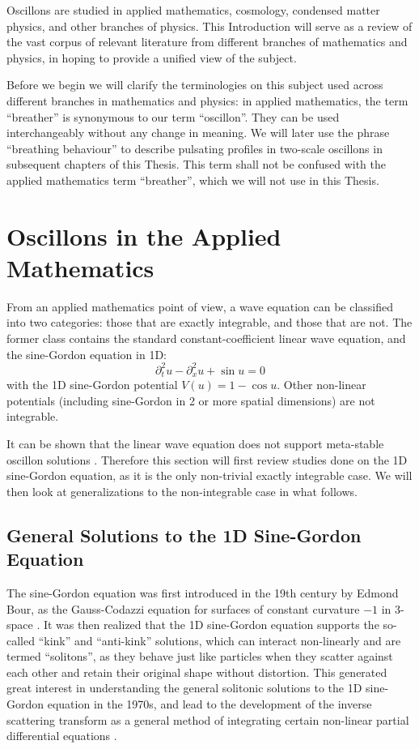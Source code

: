 \documentclass{report}
\begin{document}
Oscillons are studied in applied mathematics, cosmology, condensed matter physics, and other branches of physics. This Introduction will serve as a review of the vast corpus of relevant literature from different branches of mathematics and physics, in hoping to provide a unified view of the subject.

Before we begin we will clarify the terminologies on this subject used across different branches in mathematics and physics: in applied mathematics, the term ``breather'' is synonymous to our term ``oscillon''. They can be used interchangeably without any change in meaning. We will later use the phrase ``breathing behaviour'' to describe pulsating profiles in two-scale oscillons in subsequent chapters of this Thesis. This term shall not be confused with the applied mathematics term ``breather'', which we will not use in this Thesis.

\section{Oscillons in the Applied Mathematics}
From an applied mathematics point of view, a wave equation can be classified into two categories: those that are exactly integrable, and those that are not. The former class contains the standard constant-coefficient linear wave equation, and the sine-Gordon equation in 1D:
\begin{equation}
  \partial^2_t u - \partial^2_x u + \sin u = 0
\end{equation}
with the 1D sine-Gordon potential $V(u) = 1-\cos u$. Other non-linear potentials (including sine-Gordon in 2 or more spatial dimensions) are not integrable.

It can be shown that the linear wave equation does not support meta-stable oscillon solutions \cite{Copeland:1995fq}. Therefore this section will first review studies done on the 1D sine-Gordon equation, as it is the only non-trivial exactly integrable case. We will then look at generalizations to the non-integrable case in what follows.

\subsection{General Solutions to the 1D Sine-Gordon Equation}

The sine-Gordon equation was first introduced in the 19th century by Edmond Bour, as the Gauss-Codazzi equation for surfaces of constant curvature $-1$ in 3-space \cite{bour}. It was then realized that the 1D sine-Gordon equation supports the so-called ``kink'' and ``anti-kink'' solutions, which can interact non-linearly \cite{Perring:1962vs} and are termed ``solitons'', as they behave just like particles when they scatter against each other and retain their original shape without distortion. This generated great interest in understanding the general solitonic solutions to the 1D sine-Gordon equation in the 1970s, and lead to the development of the inverse scattering transform as a general method of integrating certain non-linear partial differential equations \cite{SAPM:SAPM1974534249}.
\end{document}
